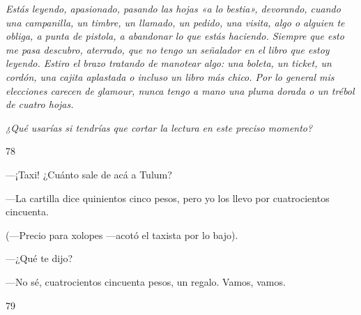 \documentclass[12pt,twoside,openright,a5paper]{book}
\begin{document}
\nopagebreak

\vspace{0.5cm}

\nopagebreak

\emph{Estás leyendo, apasionado, pasando las hojas «a lo bestia», devorando, cuando
una campanilla, un timbre, un llamado, un pedido, una visita, algo o alguien
te obliga, a punta de pistola, a abandonar lo que estás haciendo. Siempre
que esto me pasa descubro, aterrado, que no tengo un señalador en el libro
que estoy leyendo. Estiro el brazo tratando de manotear algo: una boleta, un
ticket, un cordón, una cajita aplastada o incluso un libro más chico. Por
lo general mis elecciones carecen de glamour, nunca tengo a mano una pluma
dorada o un trébol de cuatro hojas.}

\emph{¿Qué usarías si tendrías que cortar la lectura en este preciso momento?}

\vspace{0.5cm}

\hrulefill \hspace{0.1cm}\decofourleft\hspace{0.2cm} 78 \hspace{0.2cm}\decofourright \hspace{0.1cm}\hrulefill

\nopagebreak

\vspace{0.5cm}

\nopagebreak

---¡Taxi! ¿Cuánto sale de acá a Tulum?

---La cartilla dice quinientos cinco pesos, pero yo los llevo por cuatrocientos cincuenta.

(---Precio para xolopes ---acotó el taxista por lo bajo).

---¿Qué te dijo?

---No sé, cuatrocientos cincuenta pesos, un regalo. Vamos, vamos.

\vspace{0.5cm}

\hrulefill \hspace{0.1cm}\decofourleft\hspace{0.2cm} 79 \hspace{0.2cm}\decofourright \hspace{0.1cm}\hrulefill

\nopagebreak

\vspace{0.5cm}
\end{document}
